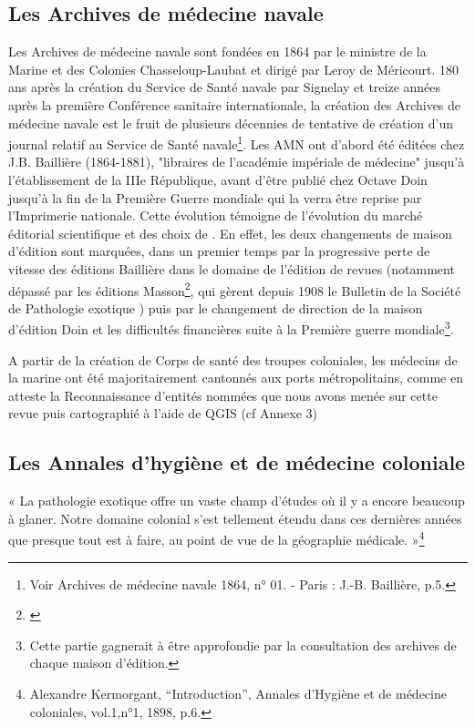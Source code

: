 \subsection{Les Archives de médecine navale}
Les Archives de médecine navale sont fondées en 1864 par le ministre de la Marine et des Colonies Chasseloup-Laubat et dirigé par Leroy de Méricourt. 180 ans après la création du Service de Santé navale par Signelay et treize années après la première Conférence sanitaire internationale, la création des Archives de médecine navale est le fruit de plusieurs décennies de tentative de création d'un journal relatif au Service de Santé navale\footnote{Voir Archives de médecine navale 1864, n° 01. - Paris : J.-B. Baillière, p.5.}. Les AMN ont d'abord été éditées chez J.B. Baillière (1864-1881), "libraires de l'académie impériale de médecine" jusqu'à l'établissement de la IIIe République, avant d'être publié chez Octave Doin jusqu'à la fin de la Première Guerre mondiale qui la verra être reprise par l'Imprimerie nationale. Cette évolution témoigne de l'évolution du marché éditorial scientifique et des choix de . En effet, les deux changements de maison d'édition sont marquées, dans un premier temps par la progressive perte de vitesse des éditions Baillière dans le domaine de l'édition de revues (notamment dépassé par les éditions Masson\footnote{\cite{tesniere_au_2021}}, qui gèrent depuis 1908 le Bulletin de la Société de Pathologie exotique ) puis par le changement de direction de la maison d'édition Doin et les difficultés financières suite à la Première guerre mondiale\footnote{Cette partie gagnerait à être approfondie par la consultation des archives de chaque maison d'édition.}. 

A partir de la création de Corps de santé des troupes coloniales, les médecins de la marine ont été majoritairement cantonnés aux ports métropolitains, comme en atteste la Reconnaissance d'entités nommées que nous avons menée sur cette revue puis cartographié à l'aide de QGIS (cf Annexe 3)

\subsection{Les Annales d'hygiène et de médecine coloniale}

\begin{changemargin}{5cm}{0cm} 
« La pathologie exotique offre un vaste champ d’études où il y a encore beaucoup à glaner. Notre domaine colonial s’est tellement étendu dans ces dernières années que presque tout est à faire, au point de vue de la géographie médicale. »\footnote{Alexandre Kermorgant, “Introduction”, Annales d’Hygiène et de médecine coloniales, vol.1,n°1, 1898, p.6.}
\end{changemargin}

